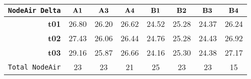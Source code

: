 \begin{tabular}{r|ccccccc}\cline{2-8}
\tt NodeAir Delta&$\bf A1$&$\bf A3$&$\bf A4$&$\bf B1$&$\bf B2$&$\bf B3$&$\bf B4$\\\hline
\bf t01& 26.80& 26.20& 26.62& 24.52& 25.28& 24.37& 26.24\\
\bf t02& 27.43& 26.06& 26.44& 24.76& 25.28& 24.43& 26.92\\
\bf t03& 29.16& 25.87& 26.66& 24.16& 25.30& 24.38& 27.17\\
\hline
\tt Total NodeAir& 23& 23& 21& 25& 23& 23& 15\\
\end{tabular}
